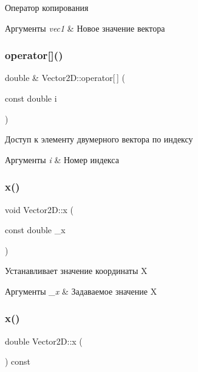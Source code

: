 Оператор копирования 
\begin{DoxyParams}{Аргументы}
{\em vec1} & Новое значение вектора \\
\hline
\end{DoxyParams}
\mbox{\label{class_vector2_d_a36aeaa2a8025f6307489b8f57220c760}} 
\subsubsection{\texorpdfstring{operator[]()}{operator[]()}}
{\footnotesize\ttfamily double \& Vector2\+D\+::operator\mbox{[}$\,$\mbox{]} (\begin{DoxyParamCaption}\item[{const double}]{i }\end{DoxyParamCaption})}

Доступ к элементу двумерного вектора по индексу 
\begin{DoxyParams}{Аргументы}
{\em i} & Номер индекса \\
\hline
\end{DoxyParams}
\mbox{\label{class_vector2_d_af38f392fab690d3fe42dbb248fbe46c7}} 
\subsubsection{\texorpdfstring{x()}{x()}\hspace{0.1cm}{\footnotesize\ttfamily [1/2]}}
{\footnotesize\ttfamily void Vector2\+D\+::x (\begin{DoxyParamCaption}\item[{const double}]{\+\_\+x }\end{DoxyParamCaption})}

Устанавливает значение координаты X 
\begin{DoxyParams}{Аргументы}
{\em \+\_\+x} & Задаваемое значение X \\
\hline
\end{DoxyParams}
\mbox{\label{class_vector2_d_a00b90f2937ea343d8cad1c3b4a340baf}} 
\subsubsection{\texorpdfstring{x()}{x()}\hspace{0.1cm}{\footnotesize\ttfamily [2/2]}}
{\footnotesize\ttfamily double Vector2\+D\+::x (\begin{DoxyParamCaption}{ }\end{DoxyParamCaption}) const}


